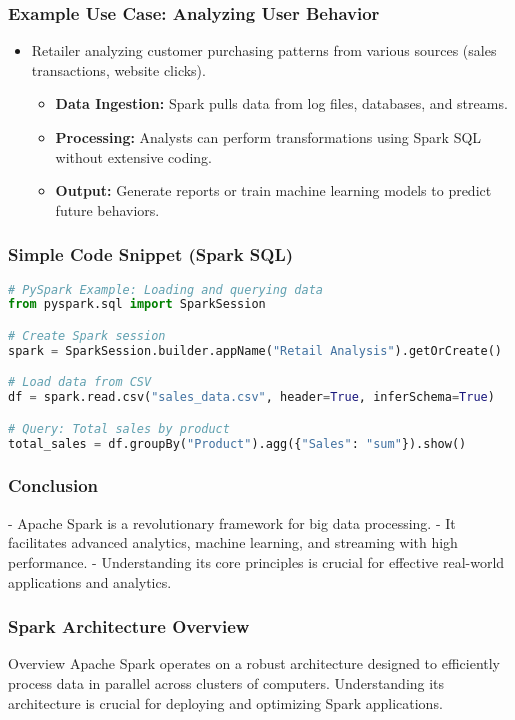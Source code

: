 \documentclass[aspectratio=169]{beamer}
\begin{document}
\begin{frame}[fragile]
    \frametitle{Example Use Case: Analyzing User Behavior}
    \begin{itemize}
        \item Retailer analyzing customer purchasing patterns from various sources (sales transactions, website clicks).
        \begin{itemize}
            \item \textbf{Data Ingestion:} Spark pulls data from log files, databases, and streams.
            \item \textbf{Processing:} Analysts can perform transformations using Spark SQL without extensive coding.
            \item \textbf{Output:} Generate reports or train machine learning models to predict future behaviors.
        \end{itemize}
    \end{itemize}
\end{frame}

\begin{frame}[fragile]
    \frametitle{Simple Code Snippet (Spark SQL)}
    \begin{lstlisting}[language=Python]
# PySpark Example: Loading and querying data
from pyspark.sql import SparkSession

# Create Spark session
spark = SparkSession.builder.appName("Retail Analysis").getOrCreate()

# Load data from CSV
df = spark.read.csv("sales_data.csv", header=True, inferSchema=True)

# Query: Total sales by product
total_sales = df.groupBy("Product").agg({"Sales": "sum"}).show()
    \end{lstlisting}
\end{frame}

\begin{frame}[fragile]
    \frametitle{Conclusion}
    - Apache Spark is a revolutionary framework for big data processing.
    - It facilitates advanced analytics, machine learning, and streaming with high performance.
    - Understanding its core principles is crucial for effective real-world applications and analytics.
\end{frame}

\begin{frame}[fragile]
    \frametitle{Spark Architecture Overview}
    \begin{block}{Overview}
        Apache Spark operates on a robust architecture designed to efficiently process data in parallel across clusters of computers. Understanding its architecture is crucial for deploying and optimizing Spark applications.
    \end{block}
\end{frame}
\end{document}

